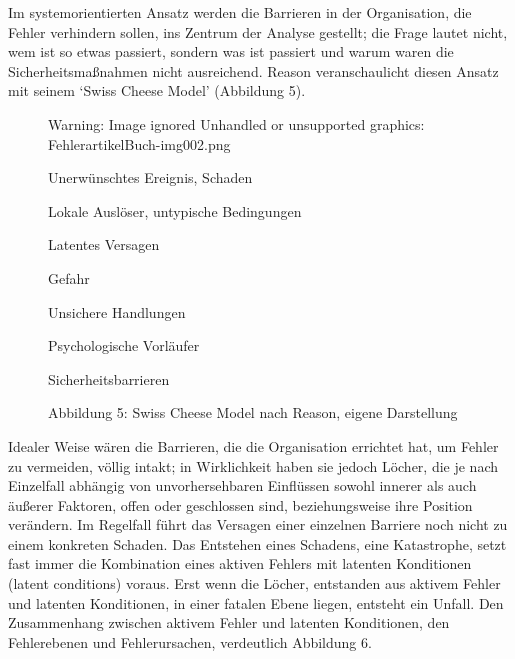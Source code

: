 Im systemorientierten Ansatz werden die Barrieren in der
Organisation, die Fehler verhindern sollen, ins Zentrum der
Analyse gestellt; die Frage lautet nicht, wem ist so etwas
passiert, sondern was ist passiert und warum waren die
Sicherheitsmaßnahmen nicht ausreichend. Reason
veranschaulicht diesen Ansatz mit seinem \enquote*{Swiss Cheese
Model} (Abbildung 5).





\begin{figure}
Warning: Image ignored
Unhandled or unsupported graphics:
FehlerartikelBuch-img002.png
 

\centering
\begin{minipage}{39.99mm}
Unerwünschtes Ereignis, Schaden
\end{minipage}
\centering
\begin{minipage}{45mm}
Lokale Auslöser, untypische Bedingungen
\end{minipage}
\centering
\begin{minipage}{39.99mm}
Latentes Versagen
\end{minipage}
\centering
\begin{minipage}{29mm}
Gefahr
\end{minipage}
\centering
\begin{minipage}{39.99mm}
Unsichere Handlungen
\end{minipage}
\centering
\begin{minipage}{39.99mm}
Psychologische Vorläufer
\end{minipage}
\centering
\begin{minipage}{39.99mm}
Sicherheitsbarrieren
\end{minipage}
\caption{Abbildung 5: Swiss Cheese Model nach Reason, eigene
Darstellung}
\end{figure}









Idealer Weise wären die Barrieren, die die Organisation
errichtet hat, um Fehler zu vermeiden, völlig intakt; in
Wirklichkeit haben sie jedoch Löcher, die je nach
Einzelfall abhängig von unvorhersehbaren Einflüssen sowohl
innerer als auch äußerer Faktoren, offen oder geschlossen
sind, beziehungsweise ihre Position verändern. Im Regelfall
führt das Versagen einer einzelnen Barriere noch nicht zu
einem konkreten Schaden. Das Entstehen eines Schadens, eine
Katastrophe, setzt fast immer die Kombination eines aktiven
Fehlers mit latenten Konditionen (latent conditions)
voraus. Erst wenn die Löcher, entstanden aus aktivem Fehler
und latenten Konditionen, in einer fatalen Ebene liegen,
entsteht ein Unfall. Den Zusammenhang zwischen aktivem
Fehler und latenten Konditionen, den Fehlerebenen und
Fehlerursachen, verdeutlich Abbildung 6.




